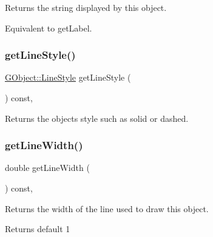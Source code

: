 Returns the string displayed by this object. 

Equivalent to get\+Label. \mbox{\label{classsgl_1_1GObject_aaf1f5ea8281e5e3486662878d26f0a13}} 
\subsubsection{\texorpdfstring{get\+Line\+Style()}{getLineStyle()}}
{\footnotesize\ttfamily \mbox{\hyperlink{classsgl_1_1GObject_a86e0f5648542856159bb40775c854aa7}{G\+Object\+::\+Line\+Style}} get\+Line\+Style (\begin{DoxyParamCaption}{ }\end{DoxyParamCaption}) const\hspace{0.3cm}{\ttfamily [virtual]}, {\ttfamily [inherited]}}



Returns the object\textquotesingle{}s style such as solid or dashed. 

\mbox{\label{classsgl_1_1GObject_a85ff266dc3eb63d9f2d8e5a4487fd3c0}} 
\subsubsection{\texorpdfstring{get\+Line\+Width()}{getLineWidth()}}
{\footnotesize\ttfamily double get\+Line\+Width (\begin{DoxyParamCaption}{ }\end{DoxyParamCaption}) const\hspace{0.3cm}{\ttfamily [virtual]}, {\ttfamily [inherited]}}



Returns the width of the line used to draw this object. 

\begin{DoxyReturn}{Returns}
default 1 
\end{DoxyReturn}
\mbox{\label{classsgl_1_1GObject_a4f83802015511edeb63b892830812c11}} 
